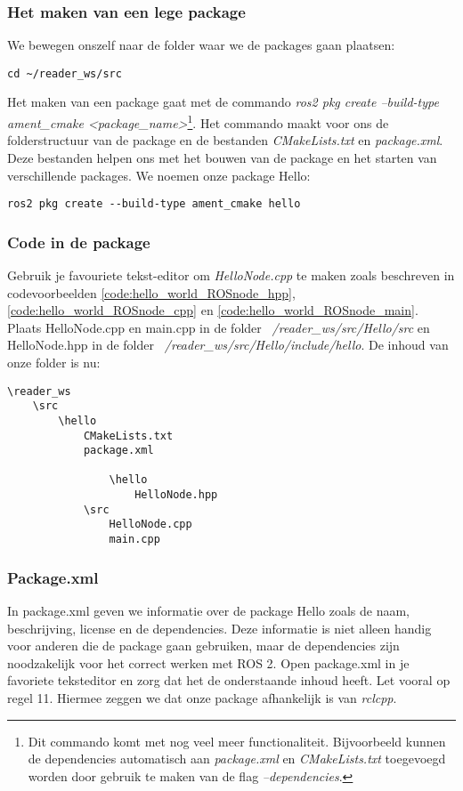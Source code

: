\subsubsection{Het maken van een lege package}
We bewegen onszelf naar de folder waar we de packages gaan plaatsen:
\begin{lstlisting}[style=DOS, caption={}, firstnumber=0, label={}]
 cd ~/reader_ws/src
\end{lstlisting}
Het maken van een package gaat met de commando \textit{ros2 pkg create --build-type ament\_cmake <package\_name>}\footnote{Dit commando komt met nog veel meer functionaliteit. Bijvoorbeeld kunnen de dependencies automatisch aan \textit{package.xml} en \textit{CMakeLists.txt} toegevoegd worden door gebruik te maken van de flag \textit{--dependencies}.}. Het commando maakt voor ons de folderstructuur van de package en de bestanden \textit{CMakeLists.txt} en \textit{package.xml}. Deze bestanden helpen ons met het bouwen van de package en het starten van verschillende packages. We noemen onze package Hello:
\begin{lstlisting}[style=DOS, caption={}, firstnumber=0, label={}]
ros2 pkg create --build-type ament_cmake hello
\end{lstlisting}

\subsubsection{Code in de package}
Gebruik je favouriete tekst-editor om \textit{HelloNode.cpp} te maken zoals beschreven in codevoorbeelden \ref{code:hello_world_ROSnode_hpp}, \ref{code:hello_world_ROSnode_cpp} en \ref{code:hello_world_ROSnode_main}. Plaats HelloNode.cpp en main.cpp in de folder \textit{~/reader\_ws/src/Hello/src} en HelloNode.hpp in de folder \textit{~/reader\_ws/src/Hello/include/hello}. De inhoud van onze folder is nu:
\begin{lstlisting}[caption={De folder structuur inclusief bestanden van de package Hello.}, firstnumber=0, label={}]
\reader_ws
    \src
        \hello
            CMakeLists.txt
            package.xml
            
                \hello
                    HelloNode.hpp
            \src
                HelloNode.cpp
                main.cpp
\end{lstlisting}

\subsubsection{Package.xml}
In package.xml geven we informatie over de package Hello zoals de naam, beschrijving, license en de dependencies. Deze informatie is niet alleen handig voor anderen die de package gaan gebruiken, maar de dependencies zijn noodzakelijk voor het correct werken met ROS 2. Open package.xml in je favoriete teksteditor en zorg dat het de onderstaande inhoud heeft. Let vooral op regel 11. Hiermee zeggen we dat onze package afhankelijk is van \textit{rclcpp}.

